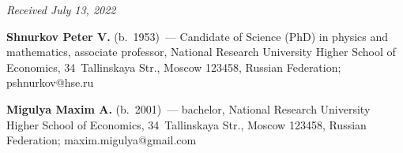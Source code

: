 \vspace*{-6pt}

\hfill{\small\textit{Received July 13, 2022}}

\Contr

\noindent
\textbf{Shnurkov Peter V.} (b.\ 1953)~--- Candidate of Science (PhD) in physics and mathematics, associate 
professor, National Research University Higher School of Economics, 34~Tallinskaya Str., Moscow 123458, 
Russian Federation; \mbox{pshnurkov@hse.ru}

\vspace*{3pt}

\noindent
\textbf{Migulya Maxim A.} (b.\ 2001)~--- bachelor, National Research University Higher School of 
Economics, 34~Tallinskaya Str., Moscow 123458, Russian Federation; \mbox{maxim.migulya@gmail.com}
  
\label{end\stat}

\renewcommand{\bibname}{\protect\rm Литература}    